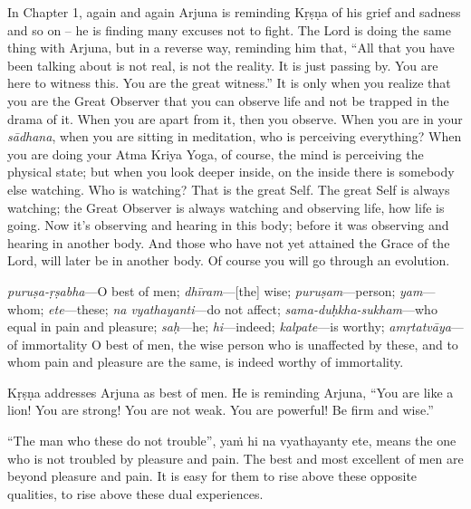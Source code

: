 In Chapter 1, again and again Arjuna is reminding Kṛṣṇa of his grief and sadness and so on -- he is finding many excuses not to fight. The Lord is doing the same thing with Arjuna, but in a reverse way, reminding him that, “All that you have been talking about is not real, is not the reality. It is just passing by. You are here to witness this. You are the great witness.” It is only when you realize that you are the Great Observer that you can observe life and not be trapped in the drama of it. When you are apart from it, then you observe. When you are in your \textit{sādhana}, when you are sitting in meditation, who is perceiving everything? When you are doing your Atma Kriya Yoga, of course, the mind is perceiving the physical state; but when you look deeper inside, on the inside there is somebody else watching. Who is watching? That is the great Self. The great Self is always watching; the Great Observer is always watching and observing life, how life is going. Now it’s observing and hearing in this body; before it was observing and hearing in another body. And those who have not yet attained the Grace of the Lord, will later be in another body. Of course you will go through an evolution.

{%
  \textit{puruṣa-ṛṣabha}---O best of men; 
  \textit{dhīram}---[the] wise; 
  \textit{puruṣam}---person; 
  \textit{yam}---whom; 
  \textit{ete}---these; 
  \textit{na vyathayanti}---do not affect; 
  \textit{sama-duḥkha-sukham}---who equal in pain and pleasure; 
  \textit{saḥ}---he; 
  \textit{hi}---indeed; 
  \textit{kalpate}---is worthy; 
  \textit{amṛtatvāya}---of immortality
}
{%
  O best of men, the wise person who is unaffected by these, and to whom pain and pleasure are the same, is indeed worthy of immortality.
}

Kṛṣṇa addresses Arjuna as  best of men. He is reminding Arjuna, “You are like a lion! You are strong! You are not weak. You are powerful! Be firm and wise.”

“The man who these do not trouble”, yaṁ hi na vyathayanty ete, means the one who is not troubled by pleasure and pain. The best and most excellent of men are beyond pleasure and pain. It is easy for them to rise above these opposite qualities, to rise above these dual experiences.

